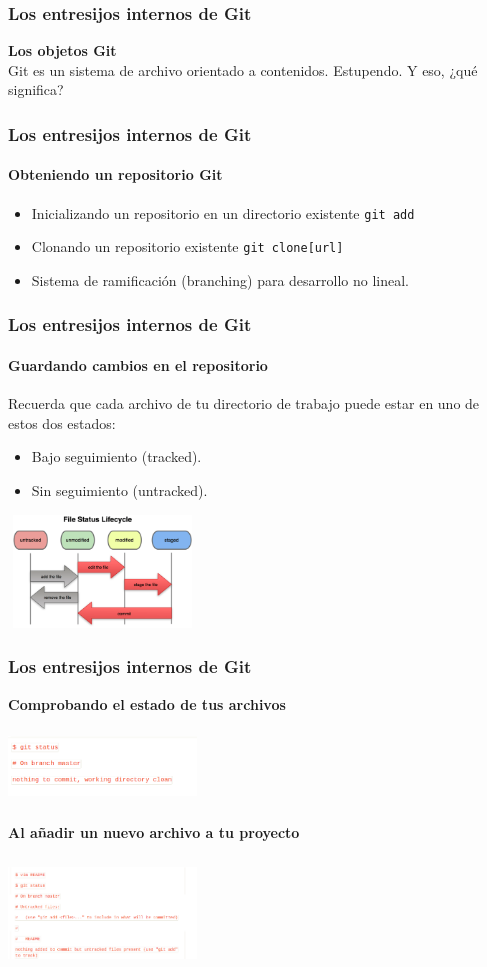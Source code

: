 \documentclass{beamer}
\begin{document}
	\begin{frame}
		\frametitle{Los entresijos internos de Git}
		\textbf{Los objetos Git}\\
		Git es un sistema de archivo orientado a contenidos. Estupendo. Y eso, ¿qué significa?\\
	\end{frame}
	\begin{frame}
		\frametitle{Los entresijos internos de Git}
		\framesubtitle{Obteniendo un repositorio Git}
		\begin{itemize}	
			\item Inicializando un repositorio en un directorio existente
			{\tt  git add}
			\item Clonando un repositorio existente
			{\tt  git clone[url]}
			\item Sistema de ramificación (branching) para desarrollo no lineal.
		\end{itemize}
	\end{frame}
	\begin{frame}
		\frametitle{Los entresijos internos de Git}
		\framesubtitle{Guardando cambios en el repositorio}
		Recuerda que cada archivo de tu directorio de trabajo puede estar en uno de estos dos estados: 
		\begin{itemize}
			\item Bajo seguimiento (tracked). 
			\item Sin seguimiento (untracked).
		\end{itemize}
		\begin{center}
			\includegraphics[width=5cm,height=3cm]{imagen5.png}
		\end{center}
	\end{frame}
	\begin{frame}
		\frametitle{Los entresijos internos de Git}
		\textbf{\small Comprobando el estado de tus archivos}
		\begin{center}
			\includegraphics[width=5cm,height=2cm]{captura1.png}
		\end{center}
		\textbf{\small Al añadir un nuevo archivo a tu proyecto}
		\begin{center}
			\includegraphics[width=5cm,height=3cm]{captura2.png}
		\end{center}
	\end{frame}
\end{document}
